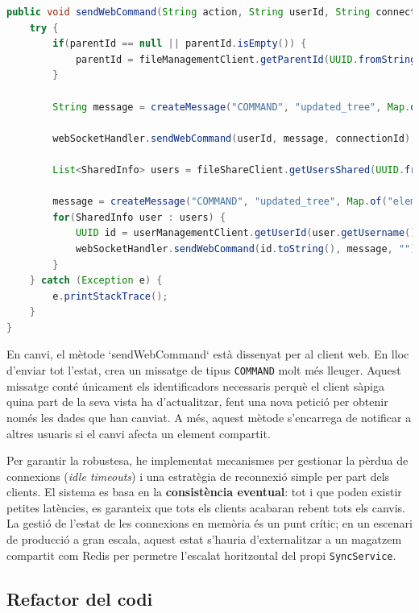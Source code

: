 \begin{lstlisting}[language=Java, caption={Enviament d'una comanda de refresc al client web a `WebSocketService`}]
public void sendWebCommand(String action, String userId, String connectionId, String elementId, String parentId) {
    try {
        if(parentId == null || parentId.isEmpty()) {
            parentId = fileManagementClient.getParentId(UUID.fromString(elementId)).toString();
        }

        String message = createMessage("COMMAND", "updated_tree", Map.of("elementId", elementId, "parentId", parentId, "section", getSection(action)));
        
        webSocketHandler.sendWebCommand(userId, message, connectionId);

        List<SharedInfo> users = fileShareClient.getUsersShared(UUID.fromString(elementId));

        message = createMessage("COMMAND", "updated_tree", Map.of("elementId", elementId, "parentId", parentId, "section", "shared"));
        for(SharedInfo user : users) {
            UUID id = userManagementClient.getUserId(user.getUsername());
            webSocketHandler.sendWebCommand(id.toString(), message, "");
        }
    } catch (Exception e) {
        e.printStackTrace();
    }
}
\end{lstlisting}

En canvi, el mètode `sendWebCommand` està dissenyat per al client web. En lloc d'enviar tot l'estat, crea un missatge de tipus \texttt{COMMAND} molt més lleuger. Aquest missatge conté únicament els identificadors necessaris perquè el client sàpiga quina part de la seva vista ha d'actualitzar, fent una nova petició per obtenir només les dades que han canviat. A més, aquest mètode s'encarrega de notificar a altres usuaris si el canvi afecta un element compartit.

Per garantir la robustesa, he implementat mecanismes per gestionar la pèrdua de connexions (\textit{idle timeouts}) i una estratègia de reconnexió simple per part dels clients. El sistema es basa en la \textbf{consistència eventual}: tot i que poden existir petites latències, es garanteix que tots els clients acabaran rebent tots els canvis. La gestió de l'estat de les connexions en memòria és un punt crític; en un escenari de producció a gran escala, aquest estat s'hauria d'externalitzar a un magatzem compartit com Redis per permetre l'escalat horitzontal del propi \texttt{SyncService}. 

\subsection{Refactor del codi}


